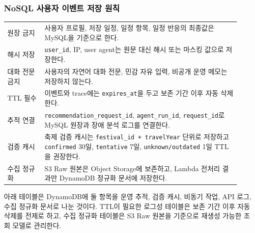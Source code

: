 \documentclass[12pt,a4paper]{article}
\newcommand{\DocNeedspace}[1]{\par\ifdim\dimexpr\pagegoal-\pagetotal\relax<#1\newpage\fi}
\begin{document}
\DocNeedspace{5\baselineskip}
\subsubsection*{NoSQL 사용자 이벤트 저장 원칙}


\DocNeedspace{20\baselineskip}
\begin{small}
\begin{longtable}{@{}>{\centering\arraybackslash}m{0.150\linewidth}>{\RaggedRight\arraybackslash}m{0.790\linewidth}@{}}
\toprule
\multicolumn{1}{>{\centering\arraybackslash}m{0.150\linewidth}}{\textbf{원칙}} & \multicolumn{1}{>{\centering\arraybackslash}m{0.790\linewidth}}{\textbf{내용}} \\
\midrule
\endhead
원장 금지 & 사용자 프로필, 저장 일정, 일정 항목, 일정 반응의 최종값은 MySQL을 기준으로 한다. \\
해시 저장 & \texttt{user\_\allowbreak{}id}, IP, user agent는 원문 대신 해시 또는 마스킹 값으로 저장한다. \\
대화 전문 금지 & 사용자의 자연어 대화 전문, 민감 자유 입력, 비공개 운영 메모는 저장하지 않는다. \\
TTL 필수 & 이벤트와 trace에는 \texttt{expires\_\allowbreak{}at}을 두고 보존 기간 이후 자동 삭제한다. \\
추적 연결 & \texttt{recommendation\_\allowbreak{}request\_\allowbreak{}id}, \texttt{agent\_\allowbreak{}run\_\allowbreak{}id}, \texttt{request\_\allowbreak{}id}로 MySQL 원장과 장애 분석 로그를 연결한다. \\
검증 캐시 & 축제 검증 캐시는 \texttt{festival\_\allowbreak{}id + travel\allowbreak{}Year} 단위로 저장하고 \texttt{confirmed} 30일, \texttt{tentative} 7일, \texttt{unknown/\allowbreak{}outdated} 1일 TTL을 권장한다. \\
수집 정규화 & S3 Raw 원본은 Object Storage에 보존하고, Lambda 전처리 결과만 DynamoDB 정규화 문서에 저장한다. \\
\bottomrule
\end{longtable}
\end{small}


\DocNeedspace{3\baselineskip}
아래 테이블은 DynamoDB에 둘 항목을 운영 추적, 검증 캐시, 비동기 작업, API 로그, 수집 정규화 문서로 나눈 것이다. TTL이 필요한 로그성 테이블은 보존 기간 이후 자동 삭제를 전제로 하고, 수집 정규화 테이블은 S3 Raw 원본을 기준으로 재생성 가능한 조회 모델로 관리한다.
\end{document}

